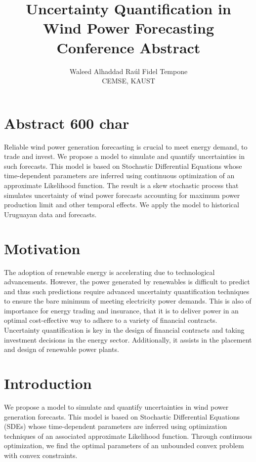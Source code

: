\documentclass[12pt]{article}
\title{Uncertainty Quantification in Wind Power Forecasting  \\ Conference Abstract}
\author{Waleed Alhaddad \quad  Ra\'ul Fidel Tempone \\ CEMSE, KAUST}
\date{}
\theoremstyle{definition}
\theoremstyle{remark}
\begin{document}
\maketitle

\section{Abstract 600 char}
Reliable wind power generation forecasting is crucial to meet energy demand, to trade and invest. We propose a model to simulate and quantify uncertainties in such forecasts. This model is based on Stochastic Differential Equations whose time-dependent parameters are inferred using continuous optimization of an approximate Likelihood function. The result is a skew stochastic process that simulates uncertainty of wind power forecasts accounting for maximum power production limit and other temporal effects. We apply the model to historical Uruguayan data and forecasts.



\section{Motivation}

The adoption of renewable energy is accelerating due to technological advancements. However, the power generated by renewables is difficult to predict and thus such predictions require advanced uncertainty quantification techniques to ensure the bare minimum of meeting electricity power demands. This is also of importance for energy trading and insurance, that it is to deliver power in an optimal cost-effective way to adhere to a variety of financial contracts. Uncertainty quantification is key in the design of financial contracts and taking investment decisions in the energy sector. Additionally, it assists in the placement and design of renewable power plants.

\section{Introduction}

    We propose a model to simulate and quantify uncertainties in wind power generation forecasts. This model is based on Stochastic Differential Equations (SDEs) whose time-dependent parameters are inferred using optimization techniques of an associated approximate Likelihood function. Through continuous optimization, we find the optimal parameters of an unbounded convex problem with convex constraints.
\end{document}
